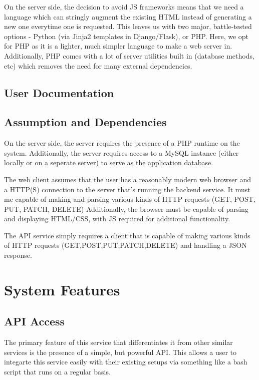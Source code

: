 \documentclass[12pt,a4paper]{report}
\begin{document}
On the server side, the decision to avoid JS frameworks means that we need a language which can stringly augment the existing HTML instead of generating a new one everytime one is requested. This leaves us with two major, battle-tested options - Python (via Jinja2 templates in Django/Flask), or PHP. Here, we opt for PHP as it is a lighter, much simpler language to make a web server in. Additionally, PHP comes with a lot of server utilities built in (database methods, etc) which removes the need for many external dependencies.
\subsection{User Documentation}
\subsection{Assumption and Dependencies}
On the server side, the server requires the presence of a PHP runtime on the system. Additionally, the server requires access to a MySQL instance (either locally or on a seperate server) to serve as the application database.

The web client assumes that the user has a reasonably modern web browser and a HTTP(S) connection to the server that's running the backend service. It must me capable of making and parsing various kinds of HTTP requests (GET, POST, PUT, PATCH, DELETE) Additionally, the browser must be capable of parsing and displaying HTML/CSS, with JS required for additional functionality.

The API service simply requires a client that is capable of making various kinds of HTTP requests (GET,POST,PUT,PATCH,DELETE) and handling a JSON response.
\section{System Features}\label{sec:system_features}

\subsection{API Access}\label{ssec:api_access}

The primary feature of this service that differentiates it from other similar services is the presence of a simple, but powerful API.
This allows a user to integarte this service easily with their existing setups via something like a bash script that runs on a regular basis.
\end{document}
